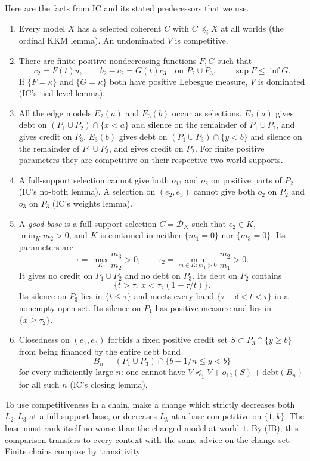 \documentclass[11pt]{article}
\theoremstyle{remark}\newtheorem{remark}[theorem]{Remark}
\newcommand{\Dscr}{\mathcal D}
\begin{document}
Here are the facts from IC and its stated predecessors that we use.
\begin{enumerate}[label=(\roman*),leftmargin=*,itemsep=3pt]
\item Every model $X$ has a selected coherent $C$ with $C\preceq_iX$ at
all worlds (the ordinal KKM lemma). An undominated $V$ is competitive.
\item There are finite positive nondecreasing functions $F,G$ such that
\[
 c_2=F(t)u,\qquad b_2-c_2=G(t)c_3\quad\text{on }P_2\cup P_3,
 \qquad \sup F\le\inf G.
\]
If $\{F=\kappa\}$ and $\{G=\kappa\}$ both have positive Lebesgue measure,
$V$ is dominated (IC's tied-level lemma).
\item All the edge models $E_2(a)$ and $E_3(b)$ occur as selections.
$E_2(a)$ gives debt on $(P_1\cup P_2)\cap\{x<a\}$ and silence on the
remainder of $P_1\cup P_2$, and gives credit on $P_3$.
$E_3(b)$ gives debt on $(P_1\cup P_3)\cap\{y<b\}$ and silence on the
remainder of $P_1\cup P_3$, and gives credit on $P_2$.
For finite positive parameters they are competitive on their respective
two-world supports.
\item A full-support selection cannot give both $o_{13}$ and $o_2$ on
positive parts of $P_2$ (IC's no-both lemma). A selection on $(e_2,e_3)$
cannot give both $o_2$ on $P_2$ and $o_3$ on $P_3$ (IC's weights lemma).
\item A \emph{good base} is a full-support selection $C=\Dscr_K$ such that
$e_2\in K$, $\min_Km_2>0$, and $K$ is contained in neither
$\{m_1=0\}$ nor $\{m_3=0\}$. Its parameters are
\[
 \tau=\max_K\frac{m_3}{m_2}>0,\qquad
 \tau_2=\min_{m\in K:m_1>0}\frac{m_2}{m_1}>0.
\]
It gives no credit on $P_1\cup P_2$ and no debt on $P_3$.
Its debt on $P_2$ contains
\[
 \{t>\tau,\ x<\tau_2(1-\tau/t)\}.
\]
Its silence on $P_3$ lies in $\{t\le\tau\}$ and meets every band
$\{\tau-\delta<t<\tau\}$ in a nonempty open set.
Its silence on $P_1$ has positive measure and lies in $\{x\ge\tau_2\}$.
\item Closedness on $(e_1,e_3)$ forbids a fixed positive credit set
$S\subset P_3\cap\{y\ge b\}$ from being financed by the entire debt band
\[
 B_n=(P_1\cup P_3)\cap\{b-1/n\le y<b\}
\]
for every sufficiently large $n$: one cannot have
$V\preceq_1V+o_{12}(S)+\mathrm{debt}(B_n)$ for all such $n$
(IC's closing lemma).
\end{enumerate}
To use competitiveness in a chain, make a change which strictly decreases
both $L_2,L_3$ at a full-support base, or decreases $L_k$ at a base competitive
on $\{1,k\}$. The base must rank itself no worse than the changed model at
world $1$. By (IB), this comparison transfers to every context with the same
advice on the change set. Finite chains compose by transitivity.
\end{document}
